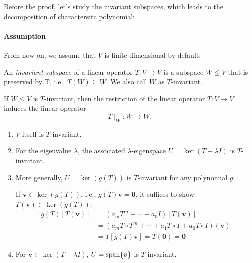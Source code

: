 Before the proof, let's study the invariant subspaces, which leads to the decomposition of charactersitc polynomial:
\paragraph{Assumption}
From now on, we assume that $V$ is finite dimensional by default.
\begin{definition}
An \emph{invariant subspace} of a linear operator $T:V\to V$ is a subspace $W\le V$ that is preserved by T, i.e., $T(W)\subseteq W$. We also call $W$ as $T$-invariant.
\end{definition}
\begin{remark}
If $W\leq V$ is $T$-invariant, then the restriction of the linear operator $T:V \to V$ induces the linear operator
\[
T\mid_W : W \to W.
\]
\end{remark}
\begin{example}
\begin{enumerate}
\item
$V$ itself is $T$-invariant.
\item
For the eigenvalue $\lambda$, the associated $\lambda$-eigenspace $U=\ker(T-\lambda I)$ is $T$-invariant.
\item
More generally, 
$U=\ker(g(T))$ is $T$-invariant for any polynomial $g$:

If $\bm v\in\ker(g(T))$, i.e., $g(T)\bm v=\bm0$, it suffices to show $T(\bm v)\in\ker(g(T))$:
\begin{align*}
g(T)[T(\bm v)] &= (a_mT^m+\cdots+a_0I)[T(\bm v)]\\
&=
(a_mT\circ T^m+\cdots+a_1T\circ T+a_0T\circ I)(\bm v)\\
&=
T[g(T)\bm v]=T(\bm 0)=\bm0
\end{align*}
\item
For $\bm v\in\ker(T-\lambda I)$, $U=\operatorname{span}\{\bm v\}$ is $T$-invariant.
\end{enumerate}
\end{example}

